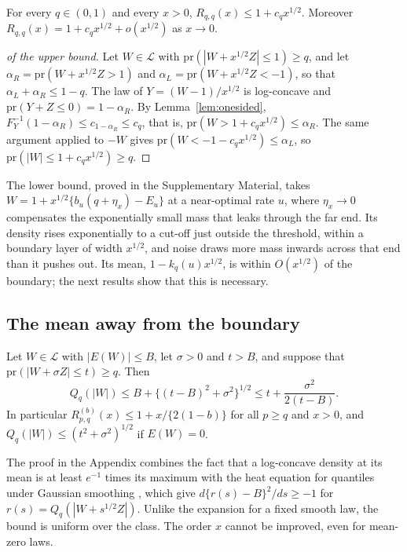 \documentclass[lineno]{biometrika}
\newcommand{\pr}{\mathrm{pr}}
\newcommand{\LC}{\mathcal{L}}
\begin{document}
\begin{theorem}\label{thm:small}
For every $q \in (0,1)$ and every $x > 0$, $R_{q,q}(x) \le 1 + c_q x^{1/2}$. Moreover $R_{q,q}(x) = 1 + c_q x^{1/2} + o(x^{1/2})$ as $x \to 0$.
\end{theorem}

\begin{proof}[of the upper bound]
Let $W \in \LC$ with $\pr(|W + x^{1/2}Z| \le 1) \ge q$, and let $\alpha_R = \pr(W + x^{1/2}Z > 1)$ and $\alpha_L = \pr(W + x^{1/2}Z < -1)$, so that $\alpha_L + \alpha_R \le 1 - q$. The law of $Y = (W - 1)/x^{1/2}$ is log-concave and $\pr(Y + Z \le 0) = 1 - \alpha_R$. By Lemma~\ref{lem:onesided}, $F_Y^{-1}(1 - \alpha_R) \le c_{1-\alpha_R} \le c_q$, that is, $\pr(W > 1 + c_q x^{1/2}) \le \alpha_R$. The same argument applied to $-W$ gives $\pr(W < -1 - c_q x^{1/2}) \le \alpha_L$, so $\pr(|W| \le 1 + c_q x^{1/2}) \ge q$.
\end{proof}

The lower bound, proved in the Supplementary Material, takes $W = 1 + x^{1/2}\{b_u(q + \eta_x) - E_u\}$ at a near-optimal rate $u$, where $\eta_x \to 0$ compensates the exponentially small mass that leaks through the far end. Its density rises exponentially to a cut-off just outside the threshold, within a boundary layer of width $x^{1/2}$, and noise draws more mass inwards across that end than it pushes out. Its mean, $1 - k_q(u)x^{1/2}$, is within $O(x^{1/2})$ of the boundary; the next results show that this is necessary.

\subsection{The mean away from the boundary}

\begin{theorem}\label{thm:mean}
Let $W \in \LC$ with $|E(W)| \le B$, let $\sigma > 0$ and $t > B$, and suppose that $\pr(|W + \sigma Z| \le t) \ge q$. Then
\[
Q_q(|W|) \le B + \{(t - B)^2 + \sigma^2\}^{1/2} \le t + \frac{\sigma^2}{2(t - B)}.
\]
In particular $R^{(b)}_{p,q}(x) \le 1 + x/\{2(1 - b)\}$ for all $p \ge q$ and $x > 0$, and $Q_q(|W|) \le (t^2 + \sigma^2)^{1/2}$ if $E(W) = 0$.
\end{theorem}

The proof in the Appendix combines the fact that a log-concave density at its mean is at least $e^{-1}$ times its maximum \citep{fradelizi1997, fradelizi2016} with the heat equation for quantiles under Gaussian smoothing \citep{steinbrecher2008}, which give $d\{r(s) - B\}^2/ds \ge -1$ for $r(s) = Q_q(|W + s^{1/2}Z|)$. Unlike the expansion for a fixed smooth law, the bound is uniform over the class. The order $x$ cannot be improved, even for mean-zero laws.
\end{document}
